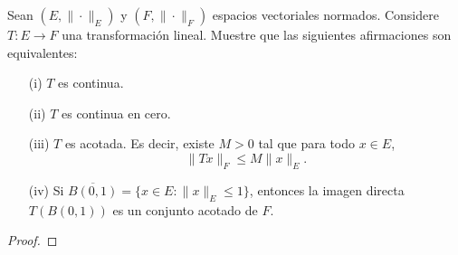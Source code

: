 Sean $(E, \| \cdot \|_E)$ y $(F, \| \cdot \|_F)$ espacios vectoriales normados. Considere  
$T : E \to F$ una transformación lineal. Muestre que las siguientes afirmaciones son equivalentes:
\begin{enumerate}
    \item[(i)] $T$ es continua.
    \item[(ii)] $T$ es continua en cero.
    \item[(iii)] $T$ es acotada. Es decir, existe $M > 0$ tal que para todo $x \in E$,  
    \[
    \|T x\|_F \leq M \|x\|_E.
    \]
    \item[(iv)] Si $\overline{B(0,1)} = \{x \in E : \|x\|_E \leq 1\}$, entonces la imagen directa $T(B(0,1))$ es un conjunto acotado de $F$.
\end{enumerate}
\begin{proof}
    
\end{proof}
